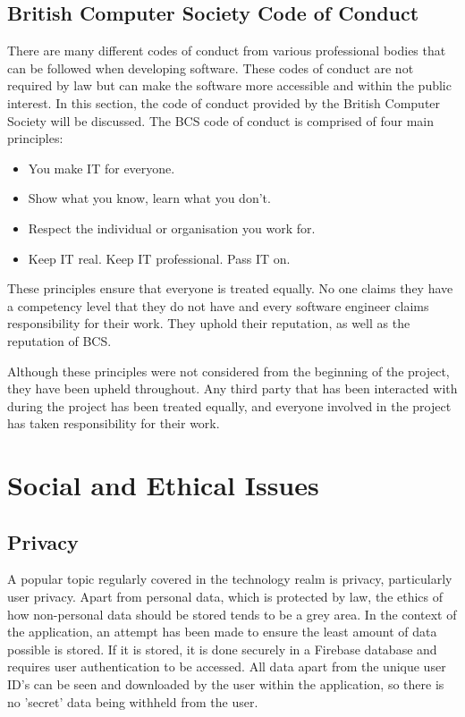 	    \subsection{British Computer Society Code of Conduct}
	    There are many different codes of conduct from various professional bodies that can be followed when developing software.  These codes of conduct are not required by law but can make the software more accessible and within the public interest.  In this section, the code of conduct provided by the British Computer Society will be discussed.  The BCS code of conduct is comprised of four main principles:
	    \begin{itemize}[noitemsep]
	        \item You make IT for everyone.
	        \item Show what you know, learn what you don't.
	        \item Respect the individual or organisation you work for.
	        \item Keep IT real. Keep IT professional. Pass IT on.
	    \end{itemize}
	    \cite{bcs}
	   
	   These principles ensure that everyone is treated equally. No one claims they have a competency level that they do not have and every software engineer claims responsibility for their work. They uphold their reputation, as well as the reputation of BCS.
	   
	   Although these principles were not considered from the beginning of the project, they have been upheld throughout.  Any third party that has been interacted with during the project has been treated equally, and everyone involved in the project has taken responsibility for their work.
	    
	\section{Social and Ethical Issues}
	    \label{sec:issues_ethical}
	    
	    \subsection{Privacy}
	    A popular topic regularly covered in the technology realm is privacy, particularly user privacy.  Apart from personal data, which is protected by law, the ethics of how non-personal data should be stored tends to be a grey area.  In the context of the application, an attempt has been made to ensure the least amount of data possible is stored. If it is stored, it is done securely in a Firebase database and requires user authentication to be accessed.  All data apart from the unique user ID's can be seen and downloaded by the user within the application, so there is no 'secret' data being withheld from the user.
	    
